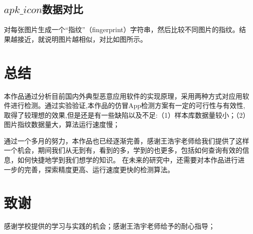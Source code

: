 \documentclass[UTF8,a4paper,10pt, twocolumn]{ctexart}
\begin{document}
\subsection{$apk\_icon$数据对比}
对每张图片生成一个“指纹”（fingerprint）字符串，然后比较不同图片的指纹。结果越接近，就说明图片越相似，对比如图所示。

\section{总结}
本作品通过分析目前国内外典型恶意应用软件的实现原理，采用两种方式对应用软件进行检测。通过实验验证,本作品的仿冒App检测方案有一定的可行性与有效性,取得了较理想的效果,但是还是有一些缺陷以及不足:（1）样本库数据量较小；（2）图片指纹数据量大，算法运行速度慢；

通过一个多月的努力，本作品也已经逐渐完善，感谢王浩宇老师给我们提供了这样一个机会，期间我们从无到有，看到的多，学到的也更多，包括如何查询有效的信息，如何快捷地学到我们想学的知识。
在未来的研究中，还需要对本作品进行进一步的完善，探索精度更高、运行速度更快的检测算法。

\section{致谢}
感谢学校提供的学习与实践的机会；感谢王浩宇老师给予的耐心指导；
\end{document}
